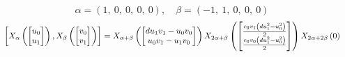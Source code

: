 \documentclass[11pt]{article}
\theoremstyle{definition}
\begin{document}
\[
\alpha = \left( 1, \  0, \  0, \  0, \  0\right), \quad \beta = \left( -1, \  1, \  0, \  0, \  0\right)
\]
\[
\scaletoalign{\textwidth}{\left[ X_{\alpha}\left(\left[\begin{matrix}u_{0}\\u_{1}\end{matrix}\right]\right), X_{\beta}\left(\left[\begin{matrix}v_{0}\\v_{1}\end{matrix}\right]\right) \right] = X_{\alpha + \beta}\left(\left[\begin{matrix}d u_{1} v_{1} - u_{0} v_{0}\\u_{0} v_{1} - u_{1} v_{0}\end{matrix}\right]\right) X_{2\alpha + \beta}\left(\left[\begin{matrix}\frac{c_{0} v_{1} \left(d u_{1}^{2} - u_{0}^{2}\right)}{2}\\\frac{c_{0} v_{0} \left(d u_{1}^{2} - u_{0}^{2}\right)}{2}\end{matrix}\right]\right) X_{2\alpha + 2\beta}\left(0\right)}
\]
\end{document}
